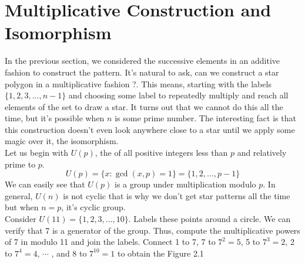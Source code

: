\documentclass{article}
\begin{document}
\section{Multiplicative Construction and Isomorphism}
In the previous section, we considered the successive elements in an additive fashion to construct the pattern. It's natural to ask, can we construct a star polygon in a multiplicative fashion ?. This means, starting with the labels $\{1,2,3,...,n-1\}$ and choosing some label to repeatedly multiply and reach all elements of the set to draw a star. It turns out that we cannot do this all the time, but it's possible when $n$ is some prime number. The interesting fact is that this construction doesn't even look anywhere close to a star until we apply some magic over it, the isomorphism.\\[2mm]
Let us begin with $U(p)$, the of all positive integers less than $p$ and relatively prime to $p$.
$$U(p) = \{x : \gcd(x,p) =1\} = \{1,2,...,p-1\}$$
We can easily see that $U(p)$ is a group under multiplication modulo $p$. In general, $U(n)$ is not cyclic that is why we don't get star patterns all the time but when $n = p$, it's cyclic group.\\[2mm]
Consider $U(11) = \{1,2,3,...,10\}$. Labels these points around a circle. We can verify that 7 is a generator of the group. Thus, compute the multiplicative powers of 7 in modulo 11 and join the labels. Connect 1 to 7, 7 to $7^2 = 5$, 5 to $7^3 = 2$, 2 to $7^4 = 4$, $\cdots$ , and 8 to $7^{10} = 1$ to obtain the Figure 2.1 
\end{document}
